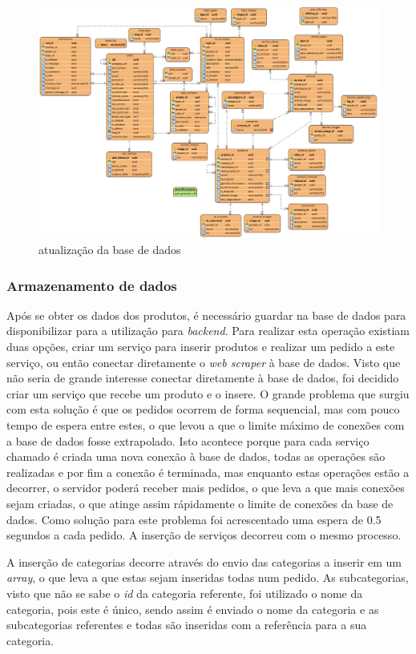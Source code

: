 \begin{figure}[htb]
    \centering
    \includegraphics[width=\textwidth]{images/diagramas/bd_final.png}
    \caption{atualização da base de dados}
    \label{fig:63}
\end{figure}

\newpage

\subsubsection{Armazenamento de dados}

Após se obter os dados dos produtos, é necessário guardar na base de dados para disponibilizar para a utilização para \textit{backend}. Para realizar esta operação existiam duas opções, criar um serviço para inserir produtos e realizar um pedido a este serviço, ou então conectar diretamente o \textit{web scraper} à base de dados. Visto que não seria de grande interesse conectar diretamente à base de dados, foi decidido criar um serviço que recebe um produto e o 
insere. O grande problema que surgiu com esta solução é que os pedidos ocorrem de forma sequencial, mas com pouco tempo de espera entre estes, o que levou a que o limite máximo de conexões com a base de dados fosse extrapolado. Isto acontece porque para cada serviço chamado é criada uma nova conexão à base de dados, todas as operações são realizadas e por fim a conexão é terminada, mas enquanto estas operações estão a decorrer, o servidor poderá receber mais pedidos, o que leva a que mais conexões sejam criadas, o que atinge assim rápidamente o limite de conexões da base de dados. Como solução para este problema foi acrescentado uma espera de 0.5 segundos a cada pedido. A inserção de serviços decorreu com o mesmo processo.

A inserção de categorias decorre através do envio das categorias a inserir em um \textit{array}, o que leva a que estas sejam inseridas todas num pedido. As subcategorias, visto que não se sabe o \textit{id} da categoria referente, foi utilizado o nome da categoria, pois este é único, sendo assim é enviado o nome da categoria e as subcategorias referentes e todas são inseridas com a referência para a sua categoria.
